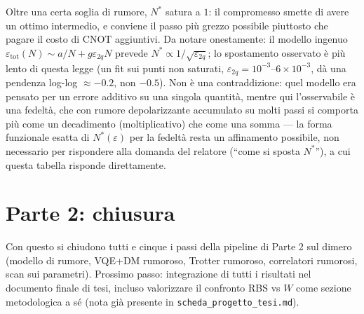 \documentclass[11pt,a4paper]{article}
\begin{document}
Oltre una certa soglia di rumore, $N^*$ satura a $1$: il compromesso
smette di avere un ottimo intermedio, e conviene il passo più grezzo
possibile piuttosto che pagare il costo di CNOT aggiuntivi. Da notare
onestamente: il modello ingenuo $\varepsilon_\text{tot}(N)\sim a/N+
g\varepsilon_{2q}N$ prevede $N^*\propto1/\sqrt{\varepsilon_{2q}}$; lo
spostamento osservato è più lento di questa legge (un fit sui punti non
saturati, $\varepsilon_{2q}=10^{-3}$--$6\times10^{-3}$, dà una pendenza
log-log $\approx-0.2$, non $-0.5$). Non è una contraddizione: quel modello
era pensato per un errore additivo su una singola quantità, mentre qui
l'osservabile è una fedeltà, che con rumore depolarizzante accumulato su
molti passi si comporta più come un decadimento (moltiplicativo) che come
una somma --- la forma funzionale esatta di $N^*(\varepsilon)$ per la
fedeltà resta un affinamento possibile, non necessario per rispondere alla
domanda del relatore (``come si sposta $N^*$''), a cui questa tabella
risponde direttamente.

\section*{Parte 2: chiusura}

Con questo si chiudono tutti e cinque i passi della pipeline di Parte 2
sul dimero (modello di rumore, VQE+DM rumoroso, Trotter rumoroso,
correlatori rumorosi, scan sui parametri). Prossimo passo: integrazione di
tutti i risultati nel documento finale di tesi, incluso valorizzare il
confronto RBS vs $W$ come sezione metodologica a sé (nota già presente in
\texttt{scheda\_progetto\_tesi.md}).
\end{document}
